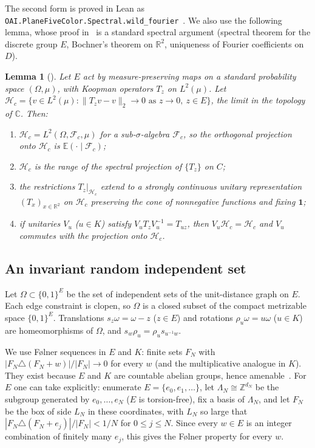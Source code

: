 \documentclass[11pt]{amsart}
\newtheorem{lemma}[theorem]{Lemma}
\theoremstyle{definition}
\theoremstyle{remark}
\newcommand{\R}{\mathbb{R}}
\newcommand{\C}{\mathbb{C}}
\newcommand{\Z}{\mathbb{Z}}
\newcommand{\E}{\mathbb{E}}
\newcommand{\Hc}{\mathcal{H}_c}
\newcommand{\Fc}{\mathcal{F}_c}
\newcommand{\one}{\mathbf 1}
\begin{document}
The second form is proved in Lean as \texttt{OAI.PlaneFiveColor.Spectral.wild\_fourier}~\cite{OAIrepo}. We also use the following lemma, whose proof in~\cite{OAI} is a standard spectral argument (spectral theorem for the discrete group $E$, Bochner's theorem on $\R^2$, uniqueness of Fourier coefficients on $D$).

\begin{lemma}[{\cite[Lemma~4.1]{OAI}}]\label{lem:cont}
Let $E$ act by measure-preserving maps on a standard probability space $(\Omega,\mu)$, with Koopman operators $T_z$ on $L^2(\mu)$. Let $\Hc=\{v\in L^2(\mu):\|T_zv-v\|_2\to0\text{ as }z\to0,\ z\in E\}$, the limit in the topology of $\C$. Then:
\begin{enumerate}[label=\textup{(\roman*)}]
\item $\Hc=L^2(\Omega,\Fc,\mu)$ for a sub-$\sigma$-algebra $\Fc$, so the orthogonal projection onto $\Hc$ is $\E(\cdot\mid\Fc)$;
\item $\Hc$ is the range of the spectral projection of $\{T_z\}$ on $C$;
\item the restrictions $T_z|_{\Hc}$ extend to a strongly continuous unitary representation $(T_x)_{x\in\R^2}$ on $\Hc$ preserving the cone of nonnegative functions and fixing $\one$;
\item if unitaries $V_u$ \textup{(}$u\in K$\textup{)} satisfy $V_uT_zV_u^{-1}=T_{uz}$, then $V_u\Hc=\Hc$ and $V_u$ commutes with the projection onto $\Hc$.
\end{enumerate}
\end{lemma}

\subsection{An invariant random independent set}
Let $\Omega\subset\{0,1\}^E$ be the set of independent sets of the unit-distance graph on $E$. Each edge constraint is clopen, so $\Omega$ is a closed subset of the compact metrizable space $\{0,1\}^E$. Translations $s_z\omega=\omega-z$ ($z\in E$) and rotations $\rho_u\omega=u\omega$ ($u\in K$) are homeomorphisms of $\Omega$, and $s_w\rho_u=\rho_us_{u^{-1}w}$.

We use Følner sequences in $E$ and $K$: finite sets $F_N$ with $|F_N\triangle(F_N+w)|/|F_N|\to0$ for every $w$ (and the multiplicative analogue in $K$). They exist because $E$ and $K$ are countable abelian groups, hence amenable~\cite[Thm.~G.5.1]{BHV}. For $E$ one can take explicitly: enumerate $E=\{e_0,e_1,\dots\}$, let $\Lambda_N\cong\Z^{d_N}$ be the subgroup generated by $e_0,\dots,e_N$ ($E$ is torsion-free), fix a basis of $\Lambda_N$, and let $F_N$ be the box of side $L_N$ in these coordinates, with $L_N$ so large that $|F_N\triangle(F_N+e_j)|/|F_N|<1/N$ for $0\le j\le N$. Since every $w\in E$ is an integer combination of finitely many $e_j$, this gives the Følner property for every $w$.
\end{document}
